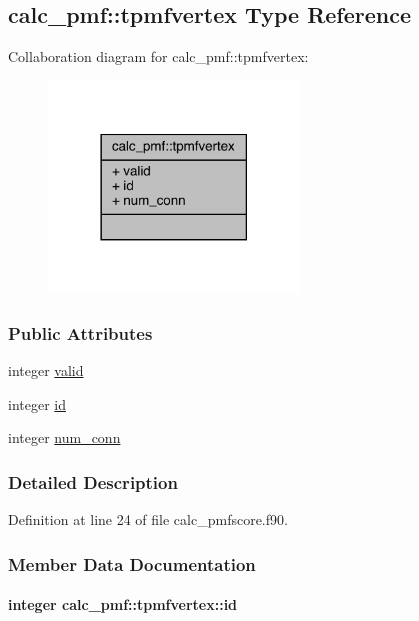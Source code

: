 \hypertarget{structcalc__pmf_1_1tpmfvertex}{\subsection{calc\-\_\-pmf\-:\-:tpmfvertex Type Reference}
\label{structcalc__pmf_1_1tpmfvertex}
}


Collaboration diagram for calc\-\_\-pmf\-:\-:tpmfvertex\-:
\nopagebreak
\begin{figure}[H]
\begin{center}
\leavevmode
\includegraphics[width=189pt]{structcalc__pmf_1_1tpmfvertex__coll__graph}
\end{center}
\end{figure}
\subsubsection*{Public Attributes}
\begin{DoxyCompactItemize}
\item 
integer \hyperlink{structcalc__pmf_1_1tpmfvertex_a34decf425f3564694916986b3992d064}{valid}
\item 
integer \hyperlink{structcalc__pmf_1_1tpmfvertex_a8e6a56fd30126200bec1d6486b42e203}{id}
\item 
integer \hyperlink{structcalc__pmf_1_1tpmfvertex_ac6c6b56a203e6b52b5dac7fc8c7a12c5}{num\-\_\-conn}
\end{DoxyCompactItemize}


\subsubsection{Detailed Description}


Definition at line 24 of file calc\-\_\-pmfscore.\-f90.



\subsubsection{Member Data Documentation}
\hypertarget{structcalc__pmf_1_1tpmfvertex_a8e6a56fd30126200bec1d6486b42e203}{
\paragraph[{id}]{\setlength{\rightskip}{0pt plus 5cm}integer calc\-\_\-pmf\-::tpmfvertex\-::id}}\label{structcalc__pmf_1_1tpmfvertex_a8e6a56fd30126200bec1d6486b42e203}


